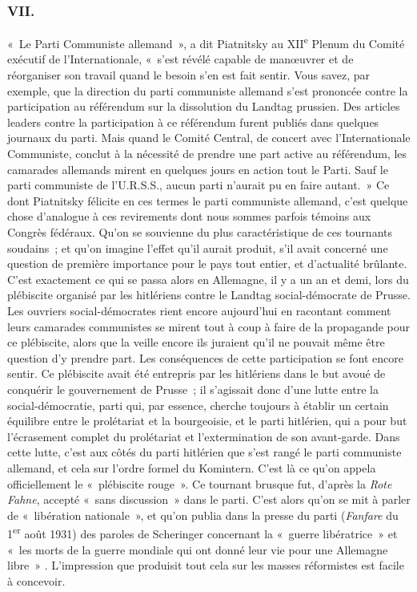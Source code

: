 \documentclass[french,twoside]{book} %
\begin{document}
\subsubsection[{VII.}]{VII.}
\noindent « Le Parti Communiste allemand », a dit Piatnitsky au XII\textsuperscript{e} Plenum du Comité exécutif de l'Internationale, « s'est révélé capable de manœuvrer et de réorganiser son travail quand le besoin s'en est fait sentir. Vous savez, par exemple, que la direction du parti communiste allemand s'est prononcée contre la participation au référendum sur la dissolution du Landtag prussien. Des articles leaders contre la participation à ce référendum furent publiés dans quelques journaux du parti. Mais quand le Comité Central, de concert avec l'Internationale Communiste, conclut à la nécessité de prendre une part active au référendum, les camarades allemands mirent en quelques jours en action tout le Parti. Sauf le parti communiste de l'U.R.S.S., aucun parti n'aurait pu en faire autant. » Ce dont Piatnitsky félicite en ces termes le parti communiste allemand, c'est quelque chose d'analogue à ces revirements dont nous sommes parfois témoins aux Congrès fédéraux. Qu'on se souvienne du plus caractéris­tique de ces tournants soudains ; et qu'on imagine l'effet qu'il aurait produit, s'il avait concerné une question de première importance pour le pays tout entier, et d'actualité brûlante. C'est exactement ce qui se passa alors en Allemagne, il y a un an et demi, lors du plébiscite organisé par les hitlériens contre le Landtag social-démocrate de Prusse. Les ouvriers social-démocrates rient encore aujourd'hui en racontant comment leurs camarades communistes se mirent tout à coup à faire de la propagande pour ce plébiscite, alors que la veille encore ils juraient qu'il ne pouvait même être question d'y prendre part. Les conséquences de cette participation se font encore sentir. Ce plébiscite avait été entrepris par les hitlériens dans le but avoué de conquérir le gouver­nement de Prusse ; il s'agissait donc d'une lutte entre la social-démocratie, parti qui, par essence, cherche toujours à établir un certain équilibre entre le prolétariat et la bourgeoisie, et le parti hitlérien, qui a pour but l'écrasement complet du prolétariat et l'extermination de son avant-garde. Dans cette lutte, c'est aux côtés du parti hitlérien que s'est rangé le parti communiste allemand, et cela sur l'ordre formel du Komintern. C'est là ce qu'on appela officiellement le « plébiscite rouge ». Ce tournant brusque fut, d'après la {\itshape Rote Fahne}, accepté « sans discussion » dans le parti. C'est alors qu'on se mit à parler de « libé­ration nationale », et qu'on publia dans la presse du parti ({\itshape Fanfare} du 1\textsuperscript{er} août 1931) des paroles de Scheringer concernant la « guerre libératrice » et « les morts de la guerre mondiale qui ont donné leur vie pour une Allemagne libre » . L'impression que produisit tout cela sur les masses réformistes est facile à concevoir.\par
\end{document}

